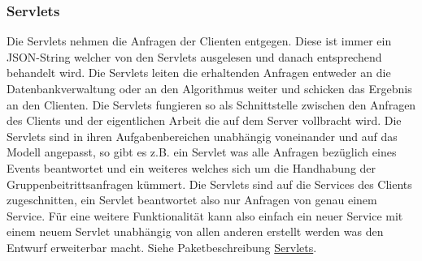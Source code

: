 \begin {center}
\end {center}

	\subsubsection{Servlets}

	Die Servlets nehmen die Anfragen der Clienten entgegen. Diese ist immer ein JSON-String welcher von den Servlets ausgelesen und danach entsprechend behandelt wird. Die Servlets leiten die erhaltenden Anfragen entweder an die Datenbankverwaltung oder an den Algorithmus weiter und schicken das Ergebnis an den Clienten.
Die Servlets fungieren so als Schnittstelle zwischen den Anfragen des Clients und der eigentlichen Arbeit die auf dem Server vollbracht wird. 
Die Servlets sind in ihren Aufgabenbereichen unabhängig voneinander und auf das Modell angepasst, so gibt es z.B. ein Servlet was alle Anfragen bezüglich eines Events beantwortet und ein weiteres welches sich um die Handhabung der Gruppenbeitrittsanfragen kümmert.
Die Servlets sind auf die Services des Clients zugeschnitten, ein Servlet beantwortet also nur Anfragen von genau einem Service.
Für eine weitere Funktionalität kann also einfach ein neuer Service mit einem neuem Servlet unabhängig von allen anderen erstellt werden was den Entwurf erweiterbar macht.   
\newline
Siehe Paketbeschreibung \hyperlink{servlet}{Servlets}.

\begin {center}
\end {center}


